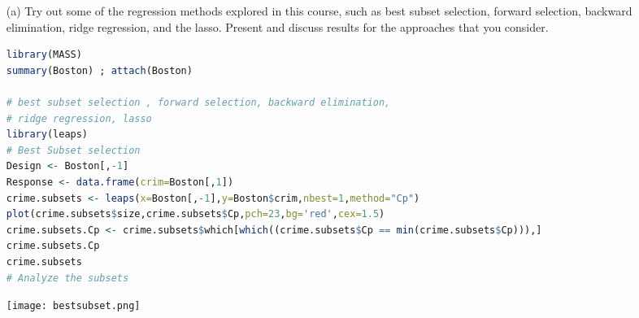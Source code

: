 \documentclass[11pt]{report}
\begin{document}
\begin{itemize}
\item[(a) ] Try out some of the regression methods explored in this course, such as best subset selection, forward selection, backward elimination, ridge regression, and the lasso. Present and discuss results for the approaches that you consider.

\begin{lstlisting}[language=R]
library(MASS)
summary(Boston) ; attach(Boston) 

# best subset selection , forward selection, backward elimination, 
# ridge regression, lasso
library(leaps)
# Best Subset selection
Design <- Boston[,-1]
Response <- data.frame(crim=Boston[,1])
crime.subsets <- leaps(x=Boston[,-1],y=Boston$crim,nbest=1,method="Cp")
plot(crime.subsets$size,crime.subsets$Cp,pch=23,bg='red',cex=1.5)
crime.subsets.Cp <- crime.subsets$which[which((crime.subsets$Cp == min(crime.subsets$Cp))),]
crime.subsets.Cp
crime.subsets
# Analyze the subsets
\end{lstlisting}
\texttt{[image: bestsubset.png]}


\end{itemize}
\end{document}
